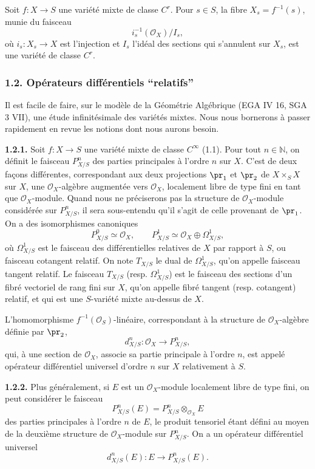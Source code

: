 \documentclass[11pt]{article}
\providecommand{\cO}{\mathcal O}
\providecommand{\N}{\mathbb N}
\begin{document}
Soit $f:X\to S$ une variété mixte de classe $C^r$. Pour $s\in S$, la fibre $X_s=f^{-1}(s)$, munie du faisceau
\[
  i_s^{-1}(\cO_X)/I_s,
\]
où $i_s:X_s\to X$ est l'injection et $I_s$ l'idéal des sections qui s'annulent sur $X_s$, est une variété de classe $C^r$.

\subsubsection*{1.2. Opérateurs différentiels ``relatifs''}
Il est facile de faire, sur le modèle de la Géométrie Algébrique (EGA IV 16, SGA 3 VII), une étude infinitésimale des variétés mixtes. Nous nous bornerons à passer rapidement en revue les notions dont nous aurons besoin.

\textbf{1.2.1.} Soit $f:X\to S$ une variété mixte de classe $C^\infty$ (1.1). Pour tout $n\in\N$, on définit le faisceau $P^n_{X/S}$ des parties principales à l'ordre $n$ sur $X$. C'est de deux façons différentes, correspondant aux deux projections $\pr_1$ et $\pr_2$ de $X\times_S X$ sur $X$, une $\cO_X$-algèbre augmentée vers $\cO_X$, localement libre de type fini en tant que $\cO_X$-module. Quand nous ne préciserons pas la structure de $\cO_X$-module considérée sur $P^n_{X/S}$, il sera sous-entendu qu'il s'agit de celle provenant de $\pr_1$. On a des isomorphismes canoniques
\[
  P^0_{X/S}\simeq\cO_X,
  \qquad
  P^1_{X/S}\simeq\cO_X\oplus\Omega^1_{X/S},
\]
où $\Omega^1_{X/S}$ est le faisceau des différentielles relatives de $X$ par rapport à $S$, ou faisceau cotangent relatif. On note $T_{X/S}$ le dual de $\Omega^1_{X/S}$, qu'on appelle faisceau tangent relatif. Le faisceau $T_{X/S}$ (resp. $\Omega^1_{X/S}$) est le faisceau des sections d'un fibré vectoriel de rang fini sur $X$, qu'on appelle fibré tangent (resp. cotangent) relatif, et qui est une $S$-variété mixte au-dessus de $X$.

L'homomorphisme $f^{-1}(\cO_S)$-linéaire, correspondant à la structure de $\cO_X$-algèbre définie par $\pr_2$,
\[
  d^n_{X/S}:\cO_X\longrightarrow P^n_{X/S},
\]
qui, à une section de $\cO_X$, associe sa partie principale à l'ordre $n$, est appelé opérateur différentiel universel d'ordre $n$ sur $X$ relativement à $S$.

\textbf{1.2.2.} Plus généralement, si $E$ est un $\cO_X$-module localement libre de type fini, on peut considérer le faisceau
\[
  P^n_{X/S}(E)=P^n_{X/S}\otimes_{\cO_X}E
\]
des parties principales à l'ordre $n$ de $E$, le produit tensoriel étant défini au moyen de la deuxième structure de $\cO_X$-module sur $P^n_{X/S}$. On a un opérateur différentiel universel
\[
  d^n_{X/S}(E):E\longrightarrow P^n_{X/S}(E).
\]
\end{document}
